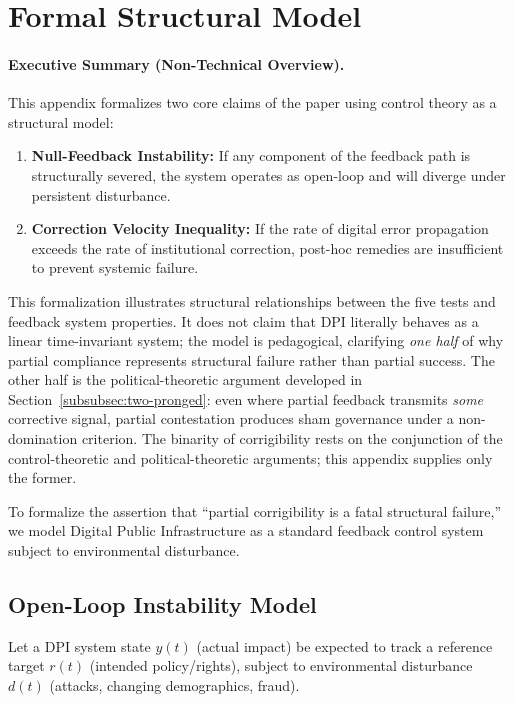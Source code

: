 \documentclass{article}
\begin{document}
\section{Formal Structural Model}
\label{appendix:proofs}

\paragraph{Executive Summary (Non-Technical Overview).}
This appendix formalizes two core claims of the paper using control theory as a structural model:
\begin{enumerate}[noitemsep]
    \item \textbf{Null-Feedback Instability:} If any component of the feedback path is structurally severed, the system operates as open-loop and will diverge under persistent disturbance.
    \item \textbf{Correction Velocity Inequality:} If the rate of digital error propagation exceeds the rate of institutional correction, post-hoc remedies are insufficient to prevent systemic failure.
\end{enumerate}
This formalization illustrates structural relationships between the five tests and feedback system properties. It does not claim that DPI literally behaves as a linear time-invariant system; the model is pedagogical, clarifying \textit{one half} of why partial compliance represents structural failure rather than partial success. The other half is the political-theoretic argument developed in Section~\ref{subsubsec:two-pronged}: even where partial feedback transmits \textit{some} corrective signal, partial contestation produces sham governance under a non-domination criterion. The binarity of corrigibility rests on the conjunction of the control-theoretic and political-theoretic arguments; this appendix supplies only the former.

\medskip

To formalize the assertion that ``partial corrigibility is a fatal structural failure,'' we model Digital Public Infrastructure as a standard feedback control system subject to environmental disturbance.

\subsection{Open-Loop Instability Model}

Let a DPI system state $y(t)$ (actual impact) be expected to track a reference target $r(t)$ (intended policy/rights), subject to environmental disturbance $d(t)$ (attacks, changing demographics, fraud).
\end{document}
